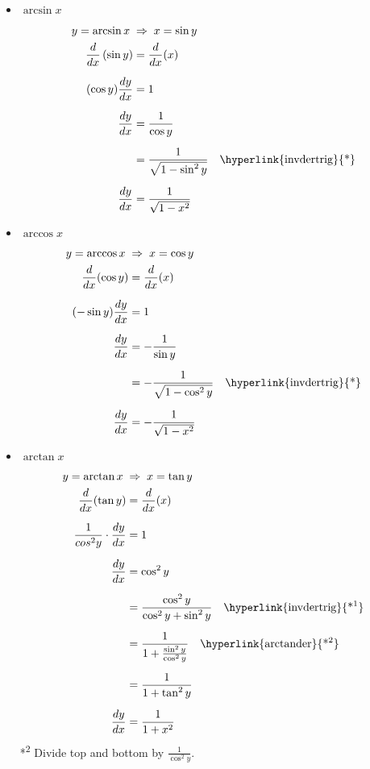 \documentclass[12pt]{article}
\begin{document}
            \begin{itemize}
                \item $\arcsin{x}$
                \begin{align*}
                    y = \arcsin{x} \; &\Rightarrow \; x = \sin{y} \\
                    \frac{d}{dx} \left( \sin{y} \right) &= \frac{d}{dx}(x) \\[6pt]
                    (\cos{y}) \frac{dy}{dx} &= 1 \\[6pt]
                    \frac{dy}{dx} &= \frac{1}{\cos{y}} \\[6pt]
                    &= \frac{1}{\sqrt{1 - \sin^2{y}}} \quad \text{\hyperlink{invdertrig}{*}}\\[6pt]
                    \frac{dy}{dx} &= \frac{1}{\sqrt{1 - x^2}}
                \end{align*}
                \item $\arccos{x}$
                \begin{align*}
                    y = \arccos{x} \; &\Rightarrow \; x = \cos{y} \\
                    \frac{d}{dx} (\cos{y}) &= \frac{d}{dx} (x) \\[6pt]
                    (-\sin{y}) \frac{dy}{dx} &= 1 \\[6pt]
                    \frac{dy}{dx} &= -\frac{1}{\sin{y}} \\[6pt]
                    &= -\frac{1}{\sqrt{1 - \cos^2{y}}} \quad \text{\hyperlink{invdertrig}{*}} \\[6pt]
                    \frac{dy}{dx} &= -\frac{1}{\sqrt{1 - x^2}}
                \end{align*}
                \item $\arctan{x}$
                \begin{align*}
                    y = \arctan{x} \; &\Rightarrow \; x = \tan{y} \\
                    \frac{d}{dx} (\tan{y}) &= \frac{d}{dx} (x) \\[6pt]
                    \frac{1}{cos^2{y}} \cdot \frac{dy}{dx} &= 1 \\[6pt]
                    \frac{dy}{dx} &= \cos^2{y} \\[6pt]
                    &= \frac{\cos^2{y}}{\cos^2{y} + \sin^2{y}} \quad \text{\hyperlink{invdertrig}{*\textsuperscript{1}}} \\[6pt]
                    &= \frac{1}{1 + \frac{\sin^2{y}}{\cos^2{y}}} \quad \text{\hyperlink{arctander}{*\textsuperscript{2}}}\\[6pt]
                    &= \frac{1}{1 + \tan^2{y}} \\[6pt]
                    \frac{dy}{dx} &= \frac{1}{1 + x^2}
                \end{align*}
                \hypertarget{arctander}{*\textsuperscript{2} Divide top and bottom by $\frac{1}{\cos^2{y}}$.}
            \end{itemize}
\end{document}

